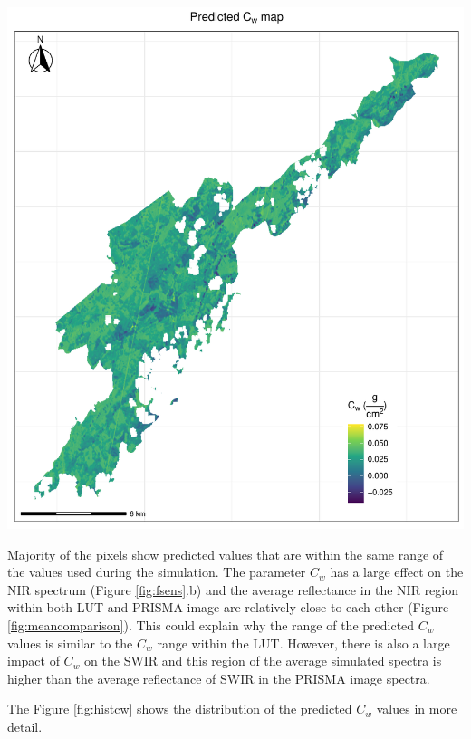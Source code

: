 \documentclass[a4paper, twoside]{templates/ociamthesis}
\let\origfigure\figure
\let\endorigfigure\endfigure
\renewenvironment{figure}[1][2] {
    \expandafter\origfigure\expandafter[H]
} {
    \endorigfigure
}
\begin{document}
\begin{figure}
\includegraphics[width=0.9\linewidth]{./figures/cw_map} \caption{Predicted map of the parameter $C_{w}$}\label{fig:mapcw}
\end{figure}

Majority of the pixels show predicted values that are within the same range of the values used during the simulation. The parameter \(C_{w}\) has a large effect on the NIR spectrum (Figure \ref{fig:fsens}.b) and the average reflectance in the NIR region within both LUT and PRISMA image are relatively close to each other (Figure \ref{fig:meancomparison}). This could explain why the range of the predicted \(C_{w}\) values is similar to the \(C_{w}\) range within the LUT. However, there is also a large impact of \(C_{w}\) on the SWIR and this region of the average simulated spectra is higher than the average reflectance of SWIR in the PRISMA image spectra.

The Figure \ref{fig:histcw} shows the distribution of the predicted \(C_{w}\) values in more detail.
\end{document}
